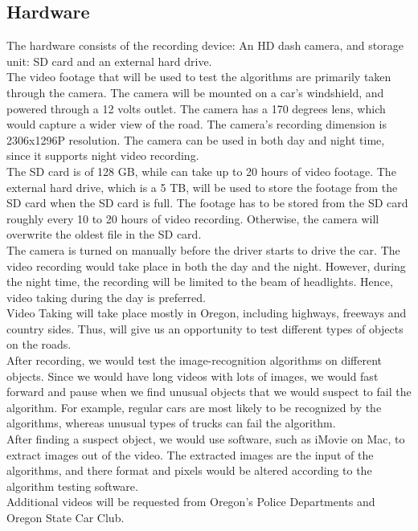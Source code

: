 \documentclass[10pt,draftclsnofoot,onecolumn,journal,compsoc]{IEEEtran}
\begin{document}
\subsection{Hardware}
The hardware consists of the recording device: An HD dash camera, and storage unit: SD card and an external hard drive.\\
The video footage that will be used to test the algorithms are primarily taken through the camera. The camera will be mounted on a car's windshield, and powered through a 12 volts outlet. The camera has a 170 degrees lens, which would capture a wider view of the road. The camera's recording dimension is 2306x1296P resolution. The camera can be used in both day and night time, since it supports night video recording.\\
The SD card is of 128 GB, while can take up to 20 hours of video footage. The external hard drive, which is a 5 TB, will be used to store the footage from the SD card when the SD card is full. The footage has to be stored from the SD card roughly every 10 to 20 hours of video recording. Otherwise, the camera will overwrite the oldest file in the SD card.\\
The camera is turned on manually before the driver starts to drive the car. The video recording would take place in both the day and the night. However, during the night time, the recording will be limited to the beam of headlights. Hence, video taking during the day is preferred. \\
Video Taking will take place mostly in Oregon, including highways, freeways and country sides. Thus, will give us an opportunity to test different types of objects on the roads. \\
After recording, we would test the image-recognition algorithms on different objects. Since we would have long videos with lots of images, we would fast forward and pause when we find unusual objects that we would suspect to fail the algorithm. For example, regular cars are most likely to be recognized by the algorithms, whereas unusual types of trucks can fail the algorithm.\\
After finding a suspect object, we would use software, such as iMovie on Mac, to extract images out of the video. The extracted images are the input of the algorithms, and there format and pixels would be altered according to the algorithm testing software.\\
Additional videos will be requested from Oregon's Police Departments and Oregon State Car Club.
\end{document}
